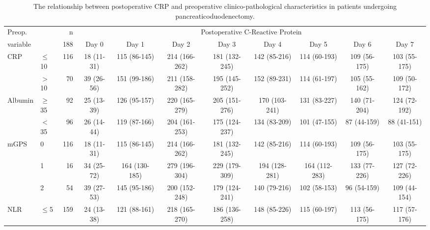 \begin{sidewaystable}[p]
	\caption{The relationship  between postoperative CRP and preoperative clinico-pathological characteristics in patients undergoing pancreaticoduodenectomy. }
	\label{table:sirs_crp}
	\footnotesize
	\centering
	\renewcommand{\arraystretch}{1.2} %

	\begin{tabular}{|llr | cccccccc|}
		\hline
		Preop.              &           & n   &                                   \multicolumn{8}{c|}{Postoperative C-Reactive Protein}                                   \\
		variable            &           & 188 & Day 0      & Day 1         & Day 2         & Day 3         & Day 4         & Day 5         & Day 6        & Day 7         \\ \hline
		CRP                 & $\leq$10  & 116 & 18 (11-31) & 115 (86-145)  & 214 (166-262) & 181 (132-245) & 142 (85-216)  & 114 (60-193)  & 109 (56-175) & 103 (55-175)  \\
		                    & $>$10     & 70  & 39 (26-56) & 151 (99-186)  & 211 (158-282) & 195 (145-252) & 152 (89-231)  & 114 (61-197)  & 105 (55-162) & 109 (50-172)  \\
		Albumin             & $\geq$35  & 92  & 25 (13-39) & 126 (95-157)  & 220 (165-279) & 205 (151-276) & 170 (103-241) & 131 (83-227)  & 140 (71-204) & 124 (72-192)  \\
		                    & $<$35     & 96  & 26 (14-44) & 119 (87-166)  & 204 (161-253) & 175 (124-237) & 134 (83-209)  & 101 (47-155)  & 87 (44-159)  & 88 (41-151)   \\
		mGPS                & 0         & 116 & 18 (11-31) & 115 (86-145)  & 214 (166-262) & 181 (132-245) & 142 (85-216)  & 114 (60-193)  & 109 (56-175) & 103 (55-175)  \\
		                    & 1         & 16  & 34 (25-72) & 164 (130-185) & 279 (196-304) & 229 (179-309) & 194 (128-281) & 164 (112-283) & 133 (77-226) & 127 (72-226)  \\
		                    & 2         & 54  & 39 (27-53) & 145 (95-186)  & 200 (152-248) & 179 (124-241) & 140 (79-216)  & 102 (58-153)  & 96 (54-159)  & 109 (44-154)  \\
		NLR                 & $\leq$5   & 159 & 24 (13-38) & 121 (88-161)  & 218 (165-270) & 186 (136-258) & 148 (85-226)  & 115 (60-197)  & 113 (56-175) & 117 (57-176)  \\

\end{tabular}
\end{sidewaystable}
